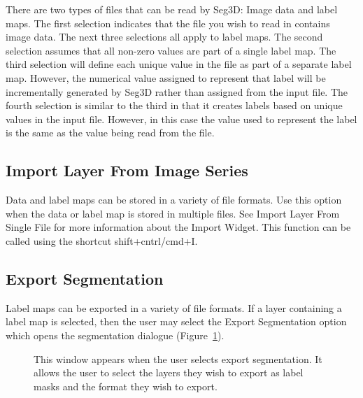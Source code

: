 \documentclass[fleqn,11pt,openany]{book}
\begin{document}
There are two types of files that can be read by Seg3D: Image data and label maps.  The first selection indicates that the file you wish to read in contains image data.  The next three selections all apply to label maps.  The second selection assumes that all non-zero values are part of a single label map.  The third selection will define each unique value in the file as part of a separate label map. However, the numerical value assigned to represent that label will be incrementally generated by Seg3D rather than assigned from the input file. The fourth selection is similar to the third in that it creates labels based on unique values in the input file.  However, in this case the value used to represent the label is the same as the value being read from the file.

\subsection{Import Layer From Image Series}
Data and label maps can be stored in a variety of file formats.  Use this option when the data or label map is stored in multiple files. See Import Layer From Single File for more information about the Import Widget. This function can be called using the shortcut shift+cntrl/cmd+I.

\subsection{Export Segmentation}
Label maps can be exported in a variety of file formats.  If a layer containing a label map is selected, then the user may select the Export Segmentation option which opens the segmentation dialogue (Figure~\ref{fig:ExportSeg}).

\begin{figure}[h!]
\caption{This window appears when the user selects export segmentation.  It allows the user to select the layers they wish to export as label masks and the format they wish to export.}\label{fig:ExportSeg}
\end{figure}
\end{document}
